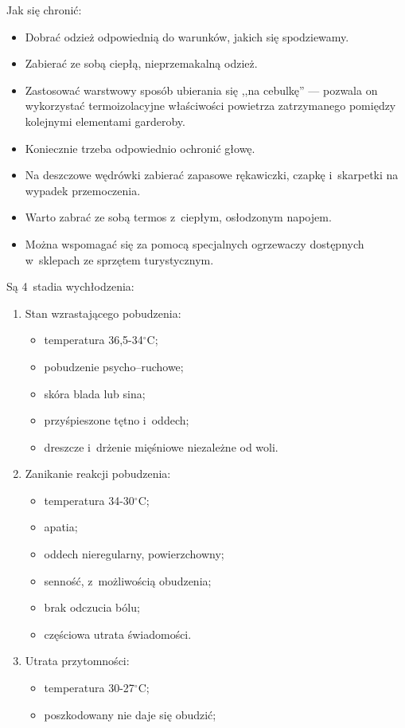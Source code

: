 \documentclass[a5paper,10pt,titlepage,twoside]{article}
\begin{document}
\begin{description}
Jak się chronić:
\begin{itemize}
\item Dobrać odzież odpowiednią do warunków, jakich się spodziewamy.
\item Zabierać ze sobą ciepłą, nieprzemakalną odzież.
\item Zastosować warstwowy sposób ubierania się ,,na cebulkę'' --- pozwala on wykorzystać termoizolacyjne właściwości powietrza zatrzymanego pomiędzy kolejnymi elementami garderoby.
\item Koniecznie trzeba odpowiednio ochronić głowę.
\item Na deszczowe wędrówki zabierać zapasowe rękawiczki, czapkę i~skarpetki na wypadek przemoczenia.
\item Warto zabrać ze sobą termos z~ciepłym, osłodzonym napojem.
\item Można wspomagać się za pomocą specjalnych ogrzewaczy dostępnych w~sklepach ze sprzętem turystycznym.
\end{itemize}
Są 4~stadia wychłodzenia:
\begin{enumerate}
\item Stan wzrastającego pobudzenia:
\begin{itemize}
\item temperatura 36,5-34$^\circ$C;
\item pobudzenie psycho--ruchowe;
\item skóra blada lub sina;
\item przyśpieszone tętno i~oddech;
\item dreszcze i~drżenie mięśniowe niezależne od woli.
\end{itemize}
\item Zanikanie reakcji pobudzenia:
\begin{itemize}
\item temperatura 34-30$^\circ$C;
\item apatia;
\item oddech nieregularny, powierzchowny;
\item senność, z~możliwością obudzenia;
\item brak odczucia bólu;
\item częściowa utrata świadomości.
\end{itemize}
\item Utrata przytomności:
\begin{itemize}
\item temperatura 30-27$^\circ$C;
\item poszkodowany nie daje się obudzić;

\end{itemize}
\end{enumerate}
\end{description}
\end{document}
